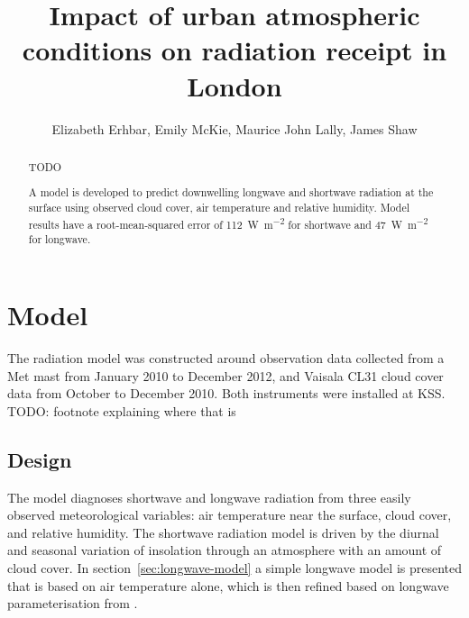 \documentclass[a4paper,titlepage, twoside]{report}
\begin{document}
\expandafter\def\csname PY@tok@err\endcsname{}

\title{Impact of urban atmospheric conditions on radiation receipt in London}
\author{Elizabeth Erhbar, Emily McKie, Maurice John Lally, James Shaw}
\maketitle

\begin{abstract}
TODO

A model is developed to predict downwelling longwave and shortwave radiation at the surface using observed cloud cover, air temperature and relative humidity.  Model results have a root-mean-squared error of \SI{112}{\watt\per\meter\squared} for shortwave and \SI{47}{\watt\per\meter\squared} for longwave.
\end{abstract}

\tableofcontents

\chapter{Model}
The radiation model was constructed around observation data collected from a Met mast from January 2010 to December 2012, and Vaisala CL31 cloud cover data from October to December 2010.  Both instruments were installed at KSS. TODO: footnote explaining where that is

\section{Design}
The model diagnoses shortwave and longwave radiation from three easily observed meteorological variables: air temperature near the surface, cloud cover, and relative humidity.  The shortwave radiation model is driven by the diurnal and seasonal variation of insolation through an atmosphere with an amount of cloud cover.  In section~\ref{sec:longwave-model} a simple longwave model is presented that is based on air temperature alone, which is then refined based on longwave parameterisation from \cite{loridan}.
\end{document}
